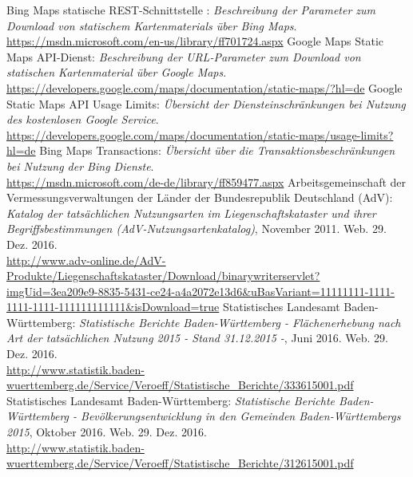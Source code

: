 \begin{thebibliography}{50}
   Bing Maps statische REST-Schnittstelle : \textit{Beschreibung der Parameter zum Download von statischem Kartenmaterials über Bing Maps}.\\ \url{https://msdn.microsoft.com/en-us/library/ff701724.aspx}
   Google Maps Static Maps API-Dienst: \textit{Beschreibung der URL-Parameter zum Download von statischen Kartenmaterial über Google Maps}.\\ \url{https://developers.google.com/maps/documentation/static-maps/?hl=de}
   Google Static Maps API Usage Limits: \textit{Übersicht der Diensteinschränkungen bei Nutzung des kostenlosen Google Service}.\\ \url{https://developers.google.com/maps/documentation/static-maps/usage-limits?hl=de}
   Bing Maps Transactions: \textit{Übersicht über die Transaktionsbeschränkungen bei Nutzung der Bing Dienste}.\\ \url{https://msdn.microsoft.com/de-de/library/ff859477.aspx}
   Arbeitsgemeinschaft der Vermessungsverwaltungen der Länder der Bundesrepublik Deutschland (AdV): \textit{Katalog der tatsächlichen Nutzungsarten im Liegenschaftskataster und ihrer Begriffsbestimmungen (AdV-Nutzungsartenkatalog)}, November 2011. Web. 29. Dez. 2016.\\ \url{http://www.adv-online.de/AdV-Produkte/Liegenschaftskataster/Download/binarywriterservlet?imgUid=3ea209e9-8835-5431-ce24-a4a2072e13d6&uBasVariant=11111111-1111-1111-1111-111111111111&isDownload=true}
   Statistisches Landesamt Baden-Württemberg: \textit{Statistische Berichte Baden-Württemberg - Flächenerhebung nach Art der tatsächlichen Nutzung 2015 - Stand 31.12.2015 -}, Juni 2016. Web. 29. Dez. 2016. \\ \url{http://www.statistik.baden-wuerttemberg.de/Service/Veroeff/Statistische_Berichte/333615001.pdf} 
   Statistisches Landesamt Baden-Württemberg: \textit{Statistische Berichte Baden-Württemberg - Bevölkerungsentwicklung in den Gemeinden Baden-Württembergs 2015}, Oktober 2016. Web. 29. Dez. 2016. \\ \url{http://www.statistik.baden-wuerttemberg.de/Service/Veroeff/Statistische_Berichte/312615001.pdf} 
\end{thebibliography}
